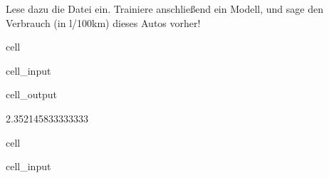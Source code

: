 \documentclass[letterpaper,10pt,english]{jupyterBook}
\begin{document}
\sphinxAtStartPar
Lese dazu die Datei  ein. Trainiere anschließend ein Modell, und sage den Verbrauch (in l/100km) dieses Autos vorher!

\begin{sphinxuseclass}{cell}\begin{sphinxVerbatimInput}

\begin{sphinxuseclass}{cell_input}
\begin{sphinxVerbatim}[commandchars=\\\{\}]
 
      
      

           

\end{sphinxVerbatim}

\end{sphinxuseclass}\end{sphinxVerbatimInput}
\begin{sphinxVerbatimOutput}

\begin{sphinxuseclass}{cell_output}
\begin{sphinxVerbatim}[commandchars=\\\{\}]
2.352145833333333
\end{sphinxVerbatim}

\end{sphinxuseclass}\end{sphinxVerbatimOutput}

\end{sphinxuseclass}
\begin{sphinxuseclass}{cell}\begin{sphinxVerbatimInput}

\begin{sphinxuseclass}{cell_input}
\begin{sphinxVerbatim}[commandchars=\\\{\}]
   

  
\end{sphinxVerbatim}

\end{sphinxuseclass}\end{sphinxVerbatimInput}

\end{sphinxuseclass}
\end{document}
